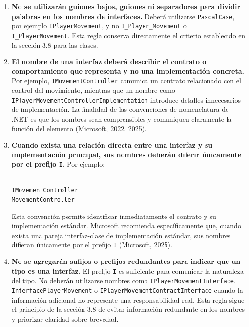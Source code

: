 \begin{enumerate}
\item \textbf{No se utilizarán guiones bajos, guiones ni separadores para dividir palabras en los nombres de interfaces.} Deberá utilizarse \texttt{PascalCase}, por ejemplo \texttt{IPlayerMovement}, y no \texttt{I\_Player\_Movement} o \texttt{I\_PlayerMovement}. Esta regla conserva directamente el criterio establecido en la sección 3.8 para las clases.

\item \textbf{El nombre de una interfaz deberá describir el contrato o comportamiento que representa y no una implementación concreta.} Por ejemplo, \texttt{IMovementController} comunica un contrato relacionado con el control del movimiento, mientras que un nombre como \texttt{IPlayerMovementControllerImplementation} introduce detalles innecesarios de implementación. La finalidad de las convenciones de nomenclatura de .NET es que los nombres sean comprensibles y comuniquen claramente la función del elemento (Microsoft, 2022, 2025).

\item \textbf{Cuando exista una relación directa entre una interfaz y su implementación principal, sus nombres deberán diferir únicamente por el prefijo \texttt{I}.} Por ejemplo:

\begin{lstlisting}[style=csharpstyle]

IMovementController
MovementController

\end{lstlisting}

Esta convención permite identificar inmediatamente el contrato y su implementación estándar. Microsoft recomienda específicamente que, cuando exista una pareja interfaz-clase de implementación estándar, sus nombres difieran únicamente por el prefijo \texttt{I} (Microsoft, 2025).

\item \textbf{No se agregarán sufijos o prefijos redundantes para indicar que un tipo es una interfaz.} El prefijo \texttt{I} es suficiente para comunicar la naturaleza del tipo. No deberán utilizarse nombres como \texttt{IPlayerMovementInterface}, \texttt{InterfacePlayerMovement} o \texttt{IPlayerMovementContractInterface} cuando la información adicional no represente una responsabilidad real. Esta regla sigue el principio de la sección 3.8 de evitar información redundante en los nombres y priorizar claridad sobre brevedad.

\end{enumerate}

